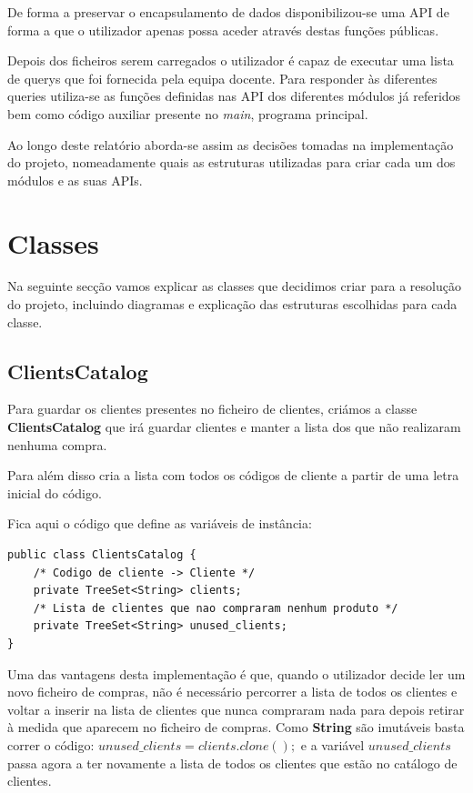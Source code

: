 \documentclass[10pt] {article}
\begin{document}
De forma a preservar o encapsulamento de dados disponibilizou-se uma API de
forma a que o utilizador apenas possa aceder através destas funções públicas.

Depois dos ficheiros serem carregados o utilizador é capaz de executar uma lista de querys que foi fornecida pela equipa docente.
Para responder às diferentes queries utiliza-se as funções definidas nas API dos diferentes módulos já referidos bem como código auxiliar presente no \emph{main}, programa principal.

Ao longo deste relatório aborda-se assim as decisões tomadas na implementação do projeto, nomeadamente quais as estruturas utilizadas para criar cada um dos módulos e as suas APIs.


\newpage
\section{Classes}
Na seguinte secção vamos explicar as classes que decidimos criar para a resolução do projeto, incluindo diagramas e explicação das estruturas escolhidas para cada classe.

\subsection{ClientsCatalog}

Para guardar os clientes presentes no ficheiro de clientes, criámos a classe \textbf{ClientsCatalog} que irá guardar clientes e manter a lista dos que não realizaram nenhuma compra.

Para além disso cria a lista com todos os códigos de cliente a partir de uma letra inicial do código.

Fica aqui o código que define as variáveis de instância:

\begin{lstlisting}
public class ClientsCatalog {
	/* Codigo de cliente -> Cliente */
	private TreeSet<String> clients;
	/* Lista de clientes que nao compraram nenhum produto */
	private TreeSet<String> unused_clients;
}
\end{lstlisting}


Uma das vantagens desta implementação é que, quando o utilizador decide ler um novo ficheiro de compras, não é necessário percorrer a lista de todos os clientes e voltar a inserir na lista de clientes que nunca compraram nada para depois retirar à medida que aparecem no ficheiro de compras.
Como \textbf{String} são imutáveis basta correr o código:
$unused\_clients = clients.clone();$ e a variável $unused\_clients$ passa agora a ter novamente a lista de todos os clientes que estão no catálogo de clientes.
\end{document}
